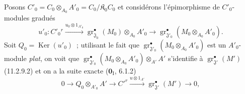 Posons $C'_0=C_0\otimes_{A_0}A'_0=C_0/\mathfrak K_0C_0$ et considérons
l'épimorphisme de $C'_0$-modules gradués
\[
u'_0:C'_0{}^{r}\xrightarrow{u_0\otimes1_{A'_0}}
\operatorname{gr}_{\mathfrak J_0}^\bullet(M_0)\otimes_{A_0}A'_0
\longrightarrow
\operatorname{gr}_{\mathfrak J'_0}^\bullet(M_0\otimes_{A_0}A'_0).
\]
Soit $Q_0=\operatorname{Ker}(u'_0)$~; utilisant le fait que
$\operatorname{gr}_{\mathfrak J'_0}^\bullet(M_0\otimes_{A_0}A'_0)$ est un
$A'_0$-module \emph{plat}, on voit que $\operatorname{gr}_{\mathfrak J'_0}^\bullet(M_0\otimes_{A_0}A'_0)\otimes_{A'}A'$
s'identifie à $\operatorname{gr}_{\mathfrak J'}^\bullet(M')$ (11.2.9.2) et on a la
suite exacte ($\mathbf 0_{\mathrm I}$, 6.1.2)
\begin{equation}
0\longrightarrow Q_0\otimes_{A'_0}A'\longrightarrow C'^{r}
\xrightarrow{u\otimes1_{A'}}\operatorname{gr}_{\mathfrak J'}^\bullet(M')
\longrightarrow0,
\label{IV.11.2.9.8-fr}
\tag{11.2.9.8}
\end{equation}

